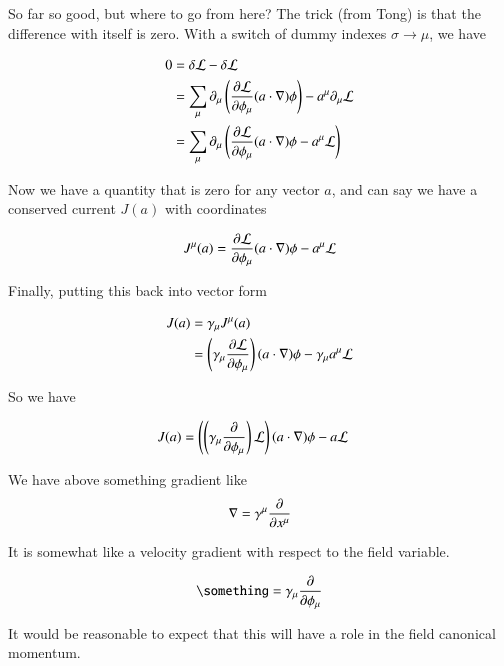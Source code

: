 \documentclass{article}
\begin{document}
So far so good, but where to go from here?  The trick (from Tong) is that
the difference with itself is zero.  With a switch of dummy indexes $\sigma \rightarrow \mu$, we have

\begin{align*}
0 &=
\delta \mathcal{L} - \delta \mathcal{L}  \\
&= 
\sum_\mu
\partial_\mu
\left(
\frac{\partial {\mathcal{L}}}{\partial {\phi_\mu}}
(a \cdot \nabla) \phi 
\right) -
 a^\mu \partial_\mu \mathcal{L} 
\\
&= 
\sum_\mu
\partial_\mu
\left(
\frac{\partial {\mathcal{L}}}{\partial {\phi_\mu}}
(a \cdot \nabla) \phi 
- a^\mu \mathcal{L} 
\right)
\\
\end{align*}

Now we have a quantity that is zero for any vector $a$, and can say we have
a conserved current $J(a)$ with coordinates

\begin{align}
J^\mu(a)
=
\frac{\partial {\mathcal{L}}}{\partial {\phi_\mu}}
(a \cdot \nabla) \phi 
- a^\mu \mathcal{L} 
\end{align}

Finally, putting this back into vector form

\begin{align*}
J(a) &= \gamma_\mu J^\mu(a) \\
&=
\left( \gamma_\mu \frac{\partial {\mathcal{L}}}{\partial {\phi_\mu}} \right)
(a \cdot \nabla) \phi 
- \gamma_\mu a^\mu \mathcal{L}  \\
\end{align*}

So we have

\begin{align}
J(a) &= 
\left( \left(\gamma_\mu \frac{\partial {}}{\partial {\phi_\mu}} \right) \mathcal{L} \right)
(a \cdot \nabla) \phi 
- a \mathcal{L}  
\end{align}

We have above something gradient like
\begin{align*}
\nabla = \gamma^\mu \frac{\partial {}}{\partial {x^\mu}}
\end{align*}

It is somewhat like a velocity gradient with respect to the field variable.

\begin{align*}
\something = \gamma_\mu \PD{\phi_\mu}{}
\end{align*}

It would be reasonable to expect that this will have a role in the field canonical momentum.



\end{document}
